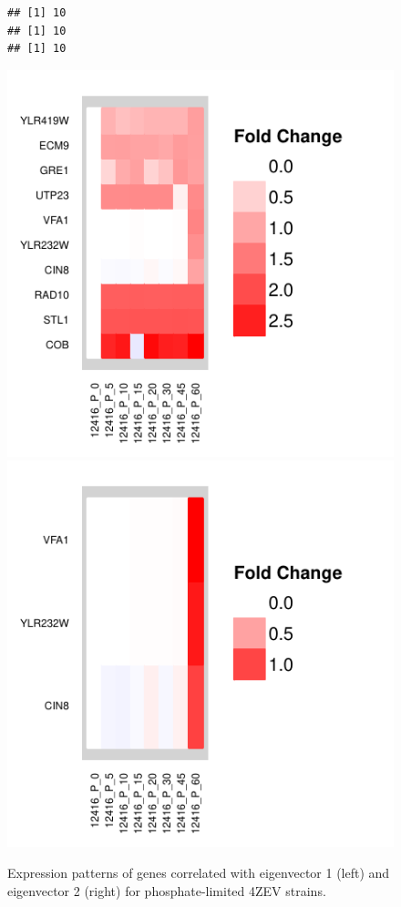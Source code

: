 \documentclass[letter]{article}\usepackage{graphicx, color}
\makeatletter
\def\maxwidth{ %
  \ifdim\Gin@nat@width>\linewidth
    \linewidth
  \else
    \Gin@nat@width
  \fi
}
\newenvironment{kframe}{%
 \def\FrameCommand##1{\hskip\@totalleftmargin \hskip-\fboxsep
 \colorbox{shadecolor}{##1}\hskip-\fboxsep
     \hskip-\linewidth \hskip-\@totalleftmargin \hskip\columnwidth}%
 \MakeFramed {\advance\hsize-\width
   \@totalleftmargin\z@ \linewidth\hsize
   \@setminipage}}%
 {\par\unskip\endMakeFramed}
\newenvironment{knitrout}{}{} %
\makeatother
\begin{document}
\begin{figure}
\begin{knitrout}
\color{fgcolor}\begin{kframe}
\begin{verbatim}
## [1] 10
## [1] 10
## [1] 10
\end{verbatim}
\end{kframe}\includegraphics[width=\maxwidth]{figure/eigengenes-phosphate1} \includegraphics[width=\maxwidth]{figure/eigengenes-phosphate2} 
\end{knitrout}

\caption{Expression patterns of genes correlated with eigenvector 1 (left) and eigenvector 2 (right) for phosphate-limited 4ZEV strains.}
\end{figure}
\end{document}
